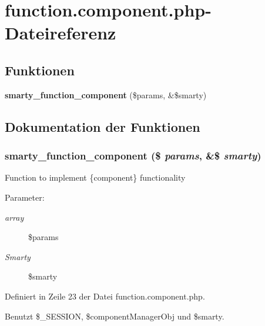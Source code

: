 \section{function.component.php-Dateireferenz}
\label{function_8component_8php}
\subsection*{Funktionen}
\begin{CompactItemize}
\item 
{\bf smarty\_\-function\_\-component} (\$params, \&\$smarty)
\end{CompactItemize}


\subsection{Dokumentation der Funktionen}
\subsubsection{\setlength{\rightskip}{0pt plus 5cm}smarty\_\-function\_\-component (\$ {\em params}, \&\$ {\em smarty})}\label{function_8component_8php_7a2b1aaa4696e4ab99569f929325a59a}


Function to implement \{component\} functionality

\begin{Desc}
\item[Parameter:]
\begin{description}
\item[{\em array}]\$params \item[{\em Smarty}]\$smarty \end{description}
\end{Desc}


Definiert in Zeile 23 der Datei function.component.php.

Benutzt \$\_\-SESSION, \$componentManagerObj und \$smarty.